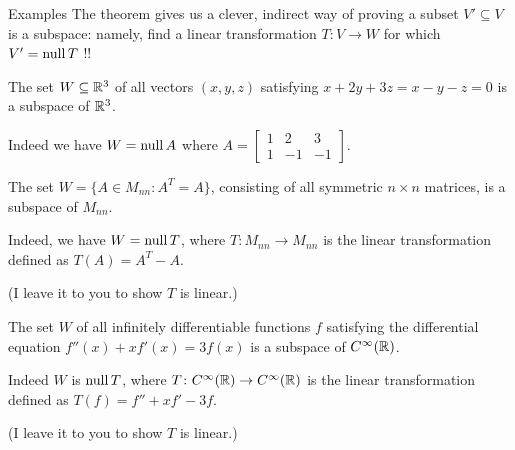 \begin{frame}{Examples}
The theorem gives us a clever, indirect way of proving a subset $V'\subseteq V$ is a subspace: namely, find a linear transformation $T\colon V\rightarrow W$ for which $V'=\operatorname{null} T$ !! 
\bpause
\begin{example}
The set $W\subseteq{\mathbb R}^3$ of all vectors $(x,y,z)$ satisfying $x+2y+3z=x-y-z=0$ is a subspace of ${\mathbb R}^3$. 

Indeed we have $W=\operatorname{null} A$ where $A=\begin{bmatrix}
1&2&3\\
1&-1&-1
\end{bmatrix}
$.
\end{example} 
\pause
\begin{example}
The set $W=\{A\in M_{nn}\colon A^T=A\}$, consisting of all symmetric $n\times n$ matrices, is a subspace of $M_{nn}$. 

Indeed, we have $W=\operatorname{null} T$, where $T\colon M_{nn}\rightarrow M_{nn}$ is the linear transformation defined as $T(A)=A^T-A$. 

(I leave it to you to show $T$ is linear.) 
\end{example}
\pause
\begin{example}
The set $W$ of all infinitely differentiable functions $f$ satisfying the differential equation $f''(x)+xf'(x)=3f(x)$ is a subspace of $C^\infty({\mathbb R})$. 

Indeed $W$ is $\operatorname{null} T$, where $T\colon C^\infty({\mathbb R})\rightarrow C^\infty({\mathbb R})$ is the linear transformation defined as $T(f)=f''+xf'-3f$.

(I leave it to you to show $T$ is linear.) 

\end{example}
\end{frame}
